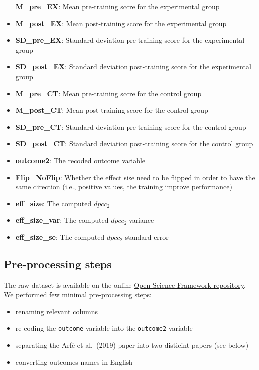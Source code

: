 \documentclass[
]{article}
\providecommand{\tightlist}{%
  \setlength{\itemsep}{0pt}\setlength{\parskip}{0pt}}
\begin{document}
\begin{itemize}
  \textbf{M\_pre\_EX}: Mean pre-training score for the experimental group
\item
  \textbf{M\_post\_EX}: Mean post-training score for the experimental group
\item
  \textbf{SD\_pre\_EX}: Standard deviation pre-training score for the experimental group
\item
  \textbf{SD\_post\_EX}: Standard deviation post-training score for the experimental group
\item
  \textbf{M\_pre\_CT}: Mean pre-training score for the control group
\item
  \textbf{M\_post\_CT}: Mean post-training score for the control group
\item
  \textbf{SD\_pre\_CT}: Standard deviation pre-training score for the control group
\item
  \textbf{SD\_post\_CT}: Standard deviation post-training score for the control group
\item
  \textbf{outcome2}: The recoded outcome variable
\item
  \textbf{Flip\_NoFlip}: Whether the effect size need to be flipped in order to have the same direction (i.e., positive values, the training improve performance)
\item
  \textbf{eff\_size}: The computed \(dpcc_2\)
\item
  \textbf{eff\_size\_var}: The computed \(dpcc_2\) variance
\item
  \textbf{eff\_size\_se}: The computed \(dpcc_2\) standard error
\end{itemize}

\hypertarget{pre-processing-steps}{%
\subsection{Pre-processing steps}\label{pre-processing-steps}}

The raw dataset is available on the online \href{https://osf.io/uvbcd/}{Open Science Framework repository}. We performed few minimal pre-processing steps:

\begin{itemize}
\tightlist
\item
  renaming relevant columns
\item
  re-coding the \texttt{outcome} variable into the \texttt{outcome2} variable
\item
  separating the Arfè et al.~(2019) paper into two disticint papers (see below)
\item
  converting outcomes names in English
\end{itemize}
\end{document}
